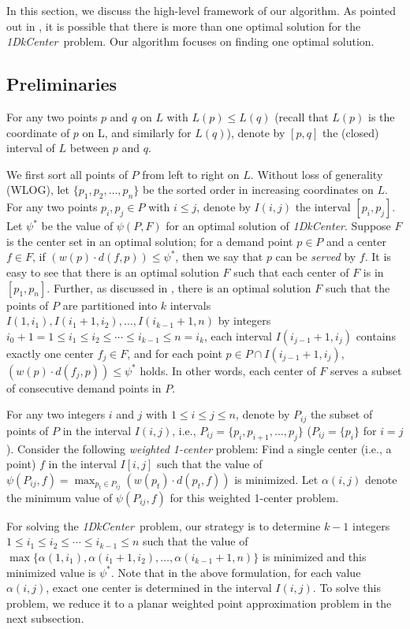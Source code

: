 \documentclass{llncs}
\def\problem{{\it 1DkCenter}}
\begin{document}
In this section, we discuss the high-level framework
of our algorithm. As pointed out in
\cite{ref:BhattacharyaOp07}, it is possible that there is more than
one optimal solution for the \problem\ problem.
Our algorithm focuses on finding one optimal solution.

\subsection{Preliminaries}

For any two points $p$ and $q$ on $L$ with $L(p)\leq L(q)$ (recall
that $L(p)$ is the coordinate of $p$ on L, and similarly for $L(q)$), denote
by $[p,q]$ the (closed) interval of $L$ between $p$ and $q$.

We first sort all points of $P$ from left to right on $L$. Without loss of
generality (WLOG), let $\{p_1, p_2,\ldots,p_n\}$ be the sorted order in
increasing coordinates on $L$. For any two points $p_i,p_j \in
P$ with $i\leq j$, denote by $I(i,j)$ the interval $[p_i,p_j]$. Let
$\psi^*$ be the value of $\psi(P,F)$ for an optimal solution of
\problem. Suppose $F$ is the center set in an optimal solution;
for a demand point $p\in P$
and a center $f\in F$, if $(w(p)\cdot d(f,p))\leq \psi^*$, then we say that
$p$ can be {\em served} by $f$.  It is easy to see that
there is an optimal solution $F$ such that each center of $F$ is in
$[p_1,p_n]$. Further, as discussed in \cite{ref:BhattacharyaOp07},
there is an optimal solution $F$ such that the
points of $P$ are partitioned into $k$ intervals $I(1,i_1),
I(i_1+1,i_2), \ldots, I(i_{k-1}+1,n)$ by integers $i_0+1=1\leq i_1\leq
i_2\leq \cdots\leq i_{k-1}\leq n =i_k$, each interval $I(i_{j-1}+1,i_j)$
contains exactly one center $f_j\in F$, and for each point $p\in
P\cap I(i_{j-1}+1,i_j)$, $(w(p)\cdot d(f_j,p))\leq \psi^*$
holds. In other words, each center of
$F$ serves a subset of consecutive demand points in $P$.


For any two integers $i$ and $j$ with $1\leq i\leq j\leq n$, denote
by $P_{ij}$ the subset of points of $P$ in the interval $I(i,j)$, i.e.,
$P_{ij}=\{p_i,p_{i+1},\ldots,p_j\}$ ($P_{ij}=\{p_i\}$ for $i=j$).
Consider the following {\em weighted 1-center} problem: Find a
single center (i.e., a point) $f$ in the interval $I[i,j]$ such that
the value of $\psi(P_{ij},f)=\max_{p_t\in P_{ij}}(w(p_t)\cdot d(p_t,f))$ is
minimized. Let $\alpha(i,j)$ denote the minimum value of
$\psi(P_{ij},f)$ for this weighted 1-center problem.

For solving the \problem\ problem, our strategy is to determine $k-1$
integers $1\leq i_1\leq i_2\leq \cdots\leq i_{k-1}\leq n$ such that the value of
$\max\{\alpha(1,i_1),\alpha(i_1+1,i_2),\ldots, \alpha(i_{k-1}+1,n)\}$
is minimized and this minimized value is $\psi^*$. Note that
in the above formulation, for each value $\alpha(i,j)$, exact one center is
determined in the interval $I(i,j)$. To solve this problem, we reduce
it to a planar weighted point approximation problem
\cite{ref:ChenAp091} in the next subsection.
\end{document}
